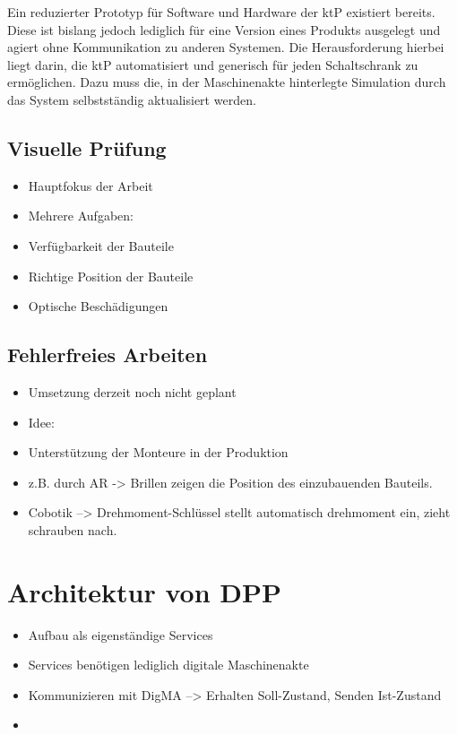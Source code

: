 \documentclass[
    type=Projektarbeit,
    status=draft, %
    language=german, %
    bibengine=bibtex,
]{unibwm-inf-thesis}
\begin{document}
    Ein reduzierter Prototyp für Software und Hardware der \ac{ktP} existiert bereits.
    Diese ist bislang jedoch lediglich für eine Version eines Produkts ausgelegt und agiert ohne Kommunikation zu anderen Systemen.
    Die Herausforderung hierbei liegt darin, die \ac{ktP} automatisiert und generisch für jeden Schaltschrank zu ermöglichen.
    Dazu muss die, in der Maschinenakte hinterlegte Simulation durch das System selbstständig aktualisiert werden.

    
    \subsection{Visuelle Prüfung}
    \begin{itemize}
        \item Hauptfokus der Arbeit
        \item Mehrere Aufgaben:
        \item Verfügbarkeit der Bauteile
        \item Richtige Position der Bauteile
        \item Optische Beschädigungen
    \end{itemize}


    \subsection{Fehlerfreies Arbeiten}
    \begin{itemize}
        \item Umsetzung derzeit noch nicht geplant
        \item Idee:
        \item Unterstützung der Monteure in der Produktion
        \item z.B. durch AR -> Brillen zeigen die Position des einzubauenden Bauteils.
        \item Cobotik --> Drehmoment-Schlüssel stellt automatisch drehmoment ein, zieht schrauben nach.
    \end{itemize}

    \section{Architektur von DPP}
    \begin{itemize}
        \item Aufbau als eigenständige Services
        \item Services benötigen lediglich digitale Maschinenakte
        \item Kommunizieren mit DigMA --> Erhalten Soll-Zustand, Senden Ist-Zustand
        \item
    \end{itemize}
\end{document}
